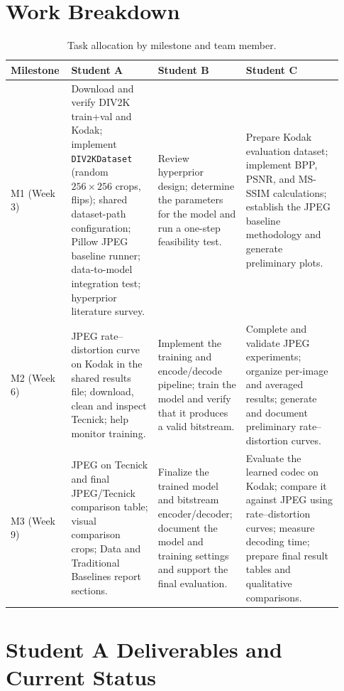 \documentclass[11pt]{article}
\begin{document}
\section{Work Breakdown}

\begin{table}[htbp]
\centering
\caption{Task allocation by milestone and team member.}
\small
\begin{tabular}{@{}p{0.14\linewidth}p{0.25\linewidth}p{0.25\linewidth}p{0.29\linewidth}@{}}
\toprule
\textbf{Milestone} & \textbf{Student A} & \textbf{Student B} & \textbf{Student C} \\
\midrule
M1 (Week 3) &
Download and verify DIV2K train+val and Kodak; implement
\texttt{DIV2KDataset} (random $256\times256$ crops, flips); shared
dataset-path configuration; Pillow JPEG baseline runner; data-to-model
integration test; hyperprior literature survey. &
Review hyperprior design; determine the parameters for the model and run a
one-step feasibility test. &
Prepare Kodak evaluation dataset; implement BPP, PSNR, and
MS-SSIM calculations; establish the JPEG baseline methodology
and generate preliminary plots. \\

M2 (Week 6) &
JPEG rate--distortion curve on Kodak in the shared results file;
download, clean and inspect Tecnick; help monitor training. &
Implement the training and encode/decode pipeline; train the model
and verify that it produces a valid bitstream. &
Complete and validate JPEG experiments; organize per-image
and averaged results; generate and document preliminary
rate--distortion curves. \\

M3 (Week 9) &
JPEG on Tecnick and final JPEG/Tecnick comparison table; visual
comparison crops; Data and Traditional Baselines report sections. &
Finalize the trained model and bitstream encoder/decoder; document
the model and training settings and support the final evaluation. &
Evaluate the learned codec on Kodak; compare it against JPEG
using rate--distortion curves; measure decoding time; prepare
final result tables and qualitative comparisons. \\
\bottomrule
\end{tabular}
\end{table}

\section{Student A Deliverables and Current Status}
\end{document}
